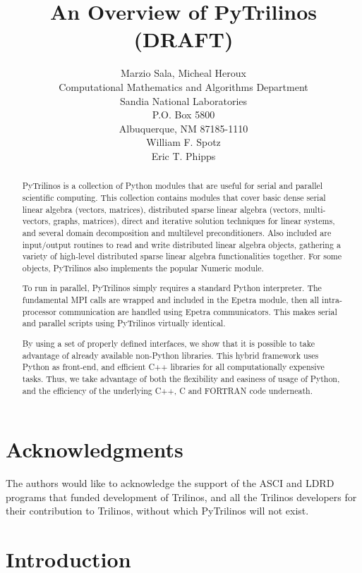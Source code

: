 \documentclass[10pt,relax]{SANDreport}
\author{Marzio Sala, Micheal Heroux\\
Computational Mathematics and Algorithms Department \\
Sandia National Laboratories \\
P.O. Box 5800 \\
Albuquerque, NM 87185-1110 \\[10pt]
William F. Spotz \\[10pt]
Eric T. Phipps \\[10pt]
}
\title{An Overview of PyTrilinos (DRAFT)}
\begin{document}
\maketitle

\begin{abstract}
PyTrilinos is a collection of Python modules that are useful for serial and
parallel scientific
computing. This collection contains modules that cover basic
dense serial linear algebra (vectors, matrices), 
distributed sparse linear algebra (vectors, multi-vectors, graphs, matrices), 
direct and iterative solution techniques for linear systems, and several
domain decomposition and multilevel
preconditioners. Also included are input/output routines to read and write
distributed linear algebra objects,
gathering a variety of
high-level distributed sparse linear algebra functionalities together.
For some objects, PyTrilinos also implements the popular Numeric module.

To run in parallel, PyTrilinos simply requires a standard Python interpreter.
The fundamental MPI calls are wrapped and included in the Epetra module, then
all intra-processor communication are handled using Epetra communicators. This
makes serial and parallel scripts using PyTrilinos virtually identical.

By using a set of properly defined interfaces, we show that it is possible to
take advantage of already available non-Python libraries. This hybrid framework
uses Python as front-end, and efficient C++ libraries for all computationally
expensive tasks. Thus, we take advantage of both the flexibility and easiness
of usage of Python, and the efficiency of the underlying C++, C and FORTRAN
code underneath. 
\end{abstract}

\clearpage
\section*{Acknowledgments}
The authors would like to acknowledge the support of the ASCI and LDRD
programs that funded development of Trilinos, and all the Trilinos developers
for their contribution to Trilinos, without which PyTrilinos will not exist.

\medskip

\SANDmain
\tableofcontents
\newpage

\section{Introduction}
\label{chap:introduction}
\end{document}

